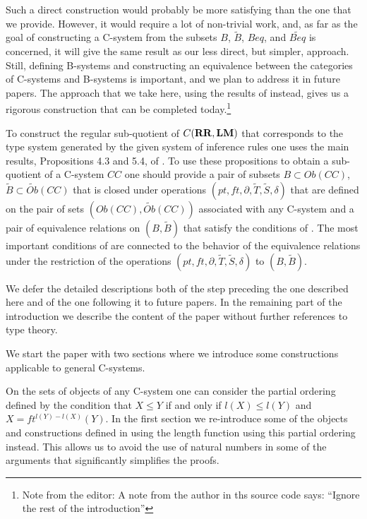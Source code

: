 \documentclass[onecolumn,12pt]{amsart}
\numberwithin{proposition}{subsection}
\newcommand{\wt}{\widetilde}
\newcommand{\RR}{{\bf RR}}
\newcommand{\LM}{{\bf LM}}
\newcommand{\editorfootnote}[1]{\footnote{Note from the editor: #1}}
\begin{document}
Such a direct construction would probably be more satisfying than the one that
we provide. However, it would require a lot of non-trivial work, and, as far as
the goal of constructing a C-system from the subsets $B$, $\wt{B}$, $Beq$, and
$\wt{Beq}$ is concerned, it will give the same result as our less direct, but simpler,
approach. Still, defining B-systems and constructing an equivalence between the
categories of C-systems and B-systems is important, and we plan to address it in
future papers. The approach that we take here, using the results of
\cite{Csubsystems} instead, gives us a rigorous construction that can be
completed today.\editorfootnote{A note from the author in ths source code says: ``Ignore the rest of the introduction''}



To construct the regular sub-quotient of $C(\RR,\LM)$ that corresponds to the
type system generated by the given system of inference rules one uses the main
results, Propositions 4.3 and 5.4, of \cite{Csubsystems}. To use these
propositions to obtain a sub-quotient of a C-system $CC$ one should provide a
pair of subsets $B\subset Ob(CC)$, $\wt{B}\subset \wt{Ob}(CC)$ that is closed
under operations $(pt,ft,\partial,\wt{T},\wt{S},\delta)$ that are defined on
the pair of sets $(Ob(CC),\wt{Ob}(CC))$ associated with any C-system
\cite[Prop. 4.3]{Csubsystems} and a pair of equivalence relations on
$(B,\wt{B})$ that satisfy the conditions of \cite[Prop. 5.4]{Csubsystems}. The
most important conditions of \cite[Prop. 5.4]{Csubsystems} are connected to the
behavior of the equivalence relations under the restriction of the operations
$(pt,ft,\partial,\wt{T},\wt{S},\delta)$ to $(B,\wt{B})$.

We defer the detailed descriptions both of the step preceding the one described
here and of the one following it to future papers. In the remaining part of the
introduction we describe the content of the paper without further references to
type theory.

We start the paper with two sections where we introduce some constructions
applicable to general C-systems.

On the sets of objects of any C-system one can consider the partial ordering
defined by the condition that $X\le Y$ if and only if $l(X)\le l(Y)$ and
$X=ft^{l(Y)-l(X)}(Y)$. In the first section we re-introduce some of the objects
and constructions defined in \cite{Csubsystems} using the length function using
this partial ordering instead. This allows us to avoid the use of natural numbers
in some of the arguments that significantly simplifies the proofs.
\end{document}
